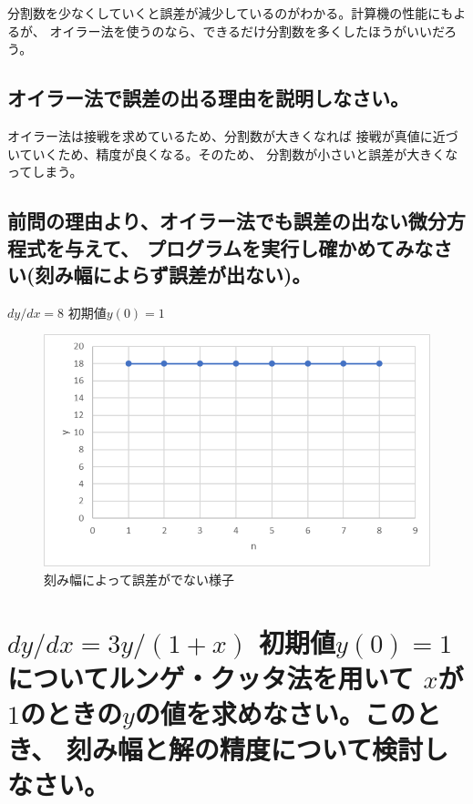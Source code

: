 \documentclass[a4paper,11pt]{jsarticle}
\begin{document}
    分割数を少なくしていくと誤差が減少しているのがわかる。計算機の性能にもよるが、
    オイラー法を使うのなら、できるだけ分割数を多くしたほうがいいだろう。

  \subsection{オイラー法で誤差の出る理由を説明しなさい。}

    オイラー法は接戦を求めているため、分割数が大きくなれば
    接戦が真値に近づいていくため、精度が良くなる。そのため、
    分割数が小さいと誤差が大きくなってしまう。

  \subsection{前問の理由より、オイラー法でも誤差の出ない微分方程式を与えて、
              プログラムを実行し確かめてみなさい(刻み幅によらず誤差が出ない)。}
  
    $dy/dx=8$ 初期値$y(0)=1$

    \begin{figure}[h]
      \centering
      \includegraphics[scale=0.75]{4}
      \caption{刻み幅によって誤差がでない様子}
      \label{fig:4}
    \end{figure}

\section{$dy/dx=3y/(1+x)$ 初期値$y(0)=1$についてルンゲ・クッタ法を用いて
          $x$が$1$のときの$y$の値を求めなさい。このとき、
          刻み幅と解の精度について検討しなさい。}
\end{document}
